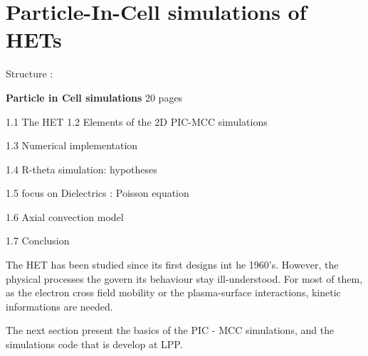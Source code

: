 
\chapter{Particle-In-Cell simulations of HETs}
\label{ch-1}
Structure :

{\bf Particle in Cell simulations} 20 pages
\begin{zzz}
  
  1.1 The HET
  1.2 Elements of the 2D PIC-MCC simulations

  1.3 Numerical implementation

  1.4 R-theta simulation: hypotheses
  
  1.5 focus on  Dielectrics : Poisson equation 

  1.6 Axial convection model
  
  1.7 Conclusion
\end{zzz}

The \ac{HET} has been studied since its first designs int he 1960's.
However, the physical processes the govern its behaviour stay ill-understood.
For most of them, as the electron cross field mobility or the plasma-surface interactions, kinetic informations are needed.


The next section present the basics of the \ac{PIC} - \ac{MCC} simulations, and the simulations code \LPPic that is develop at \ac{LPP}.


 









